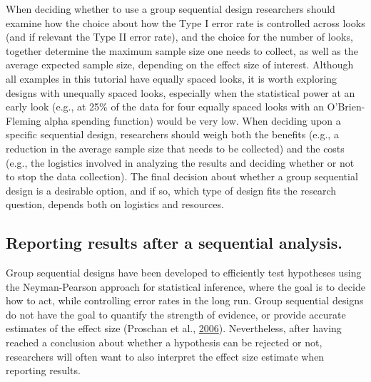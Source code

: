 \documentclass[
  english,
  ,jou, a4paper,floatsintext]{apa6}
\begin{document}
When deciding whether to use a group sequential design researchers should examine how the choice about how the Type I error rate is controlled across looks (and if relevant the Type II error rate), and the choice for the number of looks, together determine the maximum sample size one needs to collect, as well as the average expected sample size, depending on the effect size of interest. Although all examples in this tutorial have equally spaced looks, it is worth exploring designs with unequally spaced looks, especially when the statistical power at an early look (e.g., at 25\% of the data for four equally spaced looks with an O'Brien-Fleming alpha spending function) would be very low. When deciding upon a specific sequential design, researchers should weigh both the benefits (e.g., a reduction in the average sample size that needs to be collected) and the costs (e.g., the logistics involved in analyzing the results and deciding whether or not to stop the data collection). The final decision about whether a group sequential design is a desirable option, and if so, which type of design fits the research question, depends both on logistics and resources.

\hypertarget{reporting-results-after-a-sequential-analysis.}{%
\subsection{Reporting results after a sequential analysis.}\label{reporting-results-after-a-sequential-analysis.}}

Group sequential designs have been developed to efficiently test hypotheses using the Neyman-Pearson approach for statistical inference, where the goal is to decide how to act, while controlling error rates in the long run. Group sequential designs do not have the goal to quantify the strength of evidence, or provide accurate estimates of the effect size (Proschan et al., \protect\hyperlink{ref-proschan_statistical_2006}{2006}). Nevertheless, after having reached a conclusion about whether a hypothesis can be rejected or not, researchers will often want to also interpret the effect size estimate when reporting results.
\end{document}

